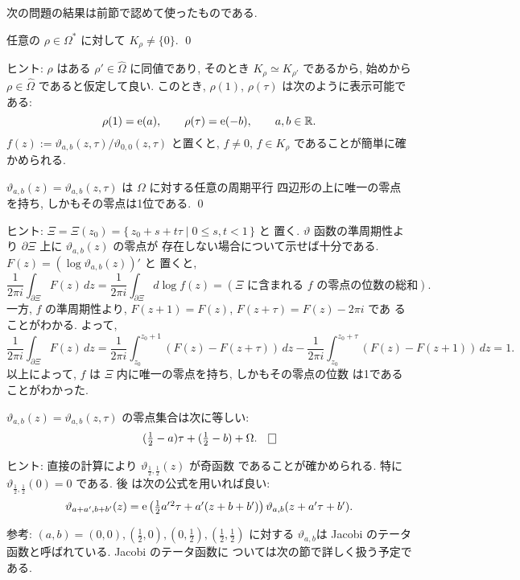 \documentclass[12pt,twoside]{jarticle}
\def\e{{\text{\rm e}}}
\def\bdr{\partial}
\def\vt{\vartheta}
\def\Omegahat{\widehat\Omega}
\def\R{{\Bbb R}} %
\begin{document}
次の問題の結果は前節で認めて使ったものである.

\begin{question}
  任意の $\rho\in\Omega^*$ に対して $K_\rho\ne\{0\}$. \qed
\end{question}

\noindent ヒント: $\rho$ はある $\rho'\in\Omegahat$ に同値であり, %
そのとき $K_\rho\simeq K_{\rho'}$ であるから, 始めから %
$\rho\in\Omegahat$ であると仮定して良い. このとき, $\rho(1)$,
$\rho(\tau)$ は次のように表示可能である:
\[
  \rho(1)=\e(a), \qquad
  \rho(\tau)=\e(-b), \qquad
  a,b\in\R.
\] %
$f(z):=\vt_{a,b}(z,\tau)/\vt_{0,0}(z,\tau)$ と置くと, %
$f\ne0$, $f\in K_\rho$ であることが簡単に確かめられる.

\begin{question}
  $\vt_{a,b}(z)=\vt_{a,b}(z,\tau)$ は $\Omega$ に対する任意の周期平行
  四辺形の上に唯一の零点を持ち, しかもその零点は1位である. \qed
\end{question}

\noindent ヒント: $\Xi=\Xi(z_0)=\{\,z_0+s+t\tau\mid 0\le s,t<1\,\}$ と
置く.  $\vt$ 函数の準周期性より $\bdr\Xi$ 上に $\vt_{a,b}(z)$ の零点が
存在しない場合について示せば十分である. $F(z)=(\log \vt_{a,b}(z))'$ と
置くと,
\[
  \frac{1}{2\pi i} \int_{\bdr \Xi} F(z)\,dz
  =
  \frac{1}{2\pi i} \int_{\bdr \Xi} d\log f(z)
  =
  (\text{$\Xi$ に含まれる $f$ の零点の位数の総和}).
\] %
一方, $f$ の準周期性より, $F(z+1)=F(z)$, $F(z+\tau)=F(z)-2\pi i$ であ
ることがわかる. よって,
\[
  \frac{1}{2\pi i} \int_{\bdr \Xi} F(z)\,dz
  =
  \frac{1}{2\pi i} \int_{z_0}^{z_0+1} (F(z)-F(z+\tau))\,dz
  -
  \frac{1}{2\pi i} \int_{z_0}^{z_0+\tau} (F(z)-F(z+1))\,dz
  = 1.
\]
以上によって, $f$ は $\Xi$ 内に唯一の零点を持ち, しかもその零点の位数
は1であることがわかった.

\begin{question}
  $\vt_{a,b}(z)=\vt_{a,b}(z,\tau)$ の零点集合は次に等しい:
  \[
  \textstyle
    (\frac{1}{2}-a)\tau + (\frac{1}{2}-b) + \Omega.
  \qed
  \]
\end{question}

\noindent ヒント: 直接の計算により $\vt_{\frac12,\frac12}(z)$ が奇函数
であることが確かめられる. 特に $\vt_{\frac12,\frac12}(0)=0$ である. 後
は次の公式を用いれば良い:
\[
\textstyle
  \vt_{a+a',b+b'}(z)
  =
  \e\left(\frac{1}{2}a'{}^2\tau+a'(z+b+b')\right)
  \vt_{a,b}(z+a'\tau+b').
\]

\medskip

\noindent 参考: %
$(a,b)=(0,0),(\frac12,0),(0,\frac12),(\frac12,\frac12)$ に対する %
$\vt_{a,b}$は Jacobi のテータ函数と呼ばれている. Jacobi のテータ函数に
ついては次の節で詳しく扱う予定である.
\end{document}
